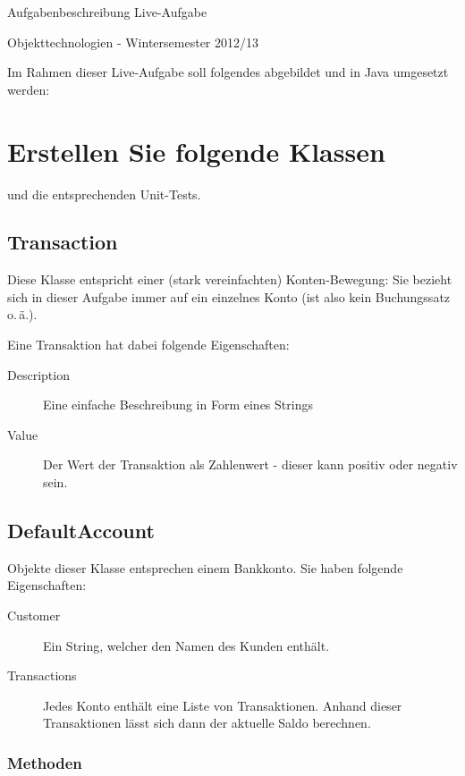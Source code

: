 \documentclass[oneside,a4paper]{scrartcl}
\author{Johannes Schneider}
\begin{document}
\centerline{\sc \large Aufgabenbeschreibung Live-Aufgabe}
\vspace{.5pc}
\centerline{\sc Objekttechnologien - Wintersemester 2012/13}
\vspace{2pc}




Im Rahmen dieser Live-Aufgabe soll folgendes abgebildet und in Java umgesetzt werden:




\section{Erstellen Sie folgende Klassen}
und die entsprechenden Unit-Tests.

\subsection{Transaction}
Diese Klasse entspricht einer (stark vereinfachten) Konten-Bewegung: Sie bezieht
sich in dieser Aufgabe immer auf ein einzelnes Konto (ist also kein Buchungssatz o.\,ä.).

Eine Transaktion hat dabei folgende Eigenschaften:

\begin{description}
	\item[Description]
		Eine einfache Beschreibung in Form eines Strings
	\item[Value]		
		Der Wert der Transaktion als Zahlenwert - dieser kann positiv oder negativ sein.		
\end{description}


\subsection{DefaultAccount}
Objekte dieser Klasse entsprechen einem Bankkonto. Sie haben folgende Eigenschaften:

\begin{description}
	\item[Customer]
		Ein String, welcher den Namen des Kunden enthält.
	\item[Transactions]		
		Jedes Konto enthält eine Liste von Transaktionen. Anhand dieser Transaktionen lässt sich
dann der aktuelle Saldo berechnen.
\end{description}


\subsubsection*{Methoden}
\end{document}
